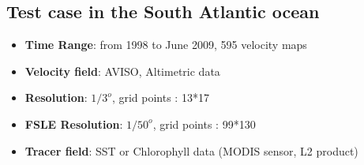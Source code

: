 \documentclass[compress,slidescentered,notes=show]{beamer}
\begin{document}
	\subsection{Test case in the South Atlantic ocean}
\begin{frame}

  \begin{itemize}
    \item \textbf{Time Range}: from 1998 to June 2009, 595 velocity maps
    \item \textbf{Velocity field}: AVISO, Altimetric data
    \item \textbf{Resolution}: $1/3^o$, grid points : 13*17
    \item \textbf{FSLE Resolution}: $1/50^o$, grid points : 99*130
  \end{itemize}
  \begin{itemize}
    \item \textbf{Tracer field}: SST or Chlorophyll data (MODIS sensor, L2 product)
  \end{itemize}

\end{frame}
\end{document}
